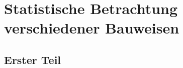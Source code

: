\chapter{Statistische Betrachtung verschiedener Bauweisen}\label{cha:Statistische Betrachtung bisheriger Bauformen}

\section{Erster Teil}